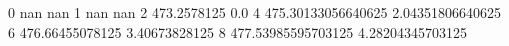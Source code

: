 0 nan nan
1 nan nan
2 473.2578125 0.0
4 475.30133056640625 2.04351806640625
6 476.66455078125 3.40673828125
8 477.53985595703125 4.28204345703125
